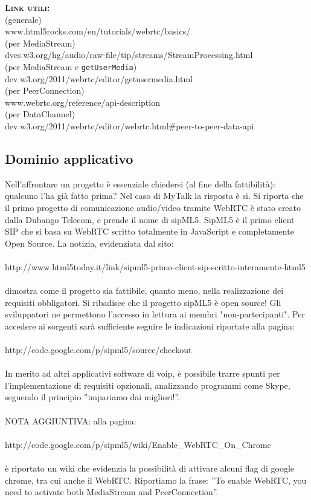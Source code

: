 \begin{description}
	\item{\scshape\bfseries Link utili:}\\
  (generale)\\
  www.html5rocks.com/en/tutorials/webrtc/basics/\\
  (per MediaStream)\\
  dvcs.w3.org/hg/audio/raw-file/tip/streams/StreamProcessing.html\\
  (per MediaStream e \texttt{getUserMedia})\\
  dev.w3.org/2011/webrtc/editor/getusermedia.html\\
  (per PeerConnection)\\
  www.webrtc.org/reference/api-description\\
  (per DataChannel)\\
  dev.w3.org/2011/webrtc/editor/webrtc.html\#peer-to-peer-data-api\\
\end{description}

\subsection{Dominio applicativo}
Nell'affrontare un progetto è essenziale chiedersi (al fine della fattibilità): qualcuno l'ha già fatto prima? Nel caso di MyTalk la risposta è si. Si riporta che il primo progetto di comunicazione audio/video tramite WebRTC è stato creato dalla Dubango Telecom, e prende il nome di sipML5. SipML5 è il primo client SIP che si basa su WebRTC scritto totalmente in JavaScript e completamente Open Source. La notizia, evidenziata dal sito:\\\\ http://www.html5today.it/link/sipml5-primo-client-sip-scritto-interamente-html5\\\\ dimostra come il progetto sia fattibile, quanto meno, nella realizzazione dei requisiti obbligatori. Si ribadisce che il progetto sipML5 è open source! Gli sviluppatori ne permettono l'accesso in lettura ai membri "non-partecipanti". Per accedere ai sorgenti sarà sufficiente seguire le indicazioni riportate alla pagina:\\\\ http://code.google.com/p/sipml5/source/checkout\\\\ In merito ad altri applicativi software di voip, è possibile trarre spunti per l'implementazione di requisiti opzionali, analizzando programmi come Skype, seguendo il principio ''impariamo dai migliori!''.
\\\\
NOTA AGGIUNTIVA: alla pagina:\\\\ http://code.google.com/p/sipml5/wiki/Enable\_WebRTC\_On\_Chrome\\\\ è riportato un wiki che evidenzia la possibilità di attivare alcuni flag di google chrome, tra cui anche il WebRTC. Riportiamo la frase: ''To enable WebRTC, you need to activate both MediaStream and PeerConnection''.


